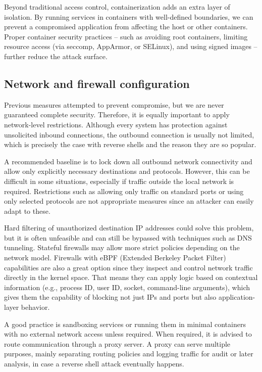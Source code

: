 Beyond traditional access control, containerization adds an extra layer of isolation. By running services in containers with well-defined boundaries, we can prevent a compromised application from affecting the host or other containers. Proper container security practices -- such as avoiding root containers, limiting resource access (via seccomp, AppArmor, or SELinux), and using signed images -- further reduce the attack surface.


\subsection{Network and firewall configuration}

Previous measures attempted to prevent compromise, but we are never guaranteed complete security. Therefore, it is equally important to apply network-level restrictions. Although every system has protection against unsolicited inbound connections, the outbound connection is usually not limited, which is precisely the case with reverse shells and the reason they are so popular.

A recommended baseline is to lock down all outbound network connectivity and allow only explicitly necessary destinations and protocols. However, this can be difficult in some situations, especially if traffic outside the local network is required. Restrictions such as allowing only traffic on standard ports or using only selected protocols are not appropriate measures since an attacker can easily adapt to these.

Hard filtering of unauthorized destination IP addresses could solve this problem, but it is often unfeasible and can still be bypassed with techniques such as DNS tunneling. Stateful firewalls may allow more strict policies depending on the network model. Firewalls with eBPF (Extended Berkeley Packet Filter) \cite{ebpf-wiki} capabilities are also a great option since they inspect and control network traffic directly in the kernel space. That means they can apply logic based on contextual information (e.g., process ID, user ID, socket, command-line arguments), which gives them the capability of blocking not just IPs and ports but also application-layer behavior.

A good practice is sandboxing services or running them in minimal containers with no external network access unless required. When required, it is advised to route communication through a proxy server. A proxy can serve multiple purposes, mainly separating routing policies and logging traffic for audit or later analysis, in case a reverse shell attack eventually happens.


